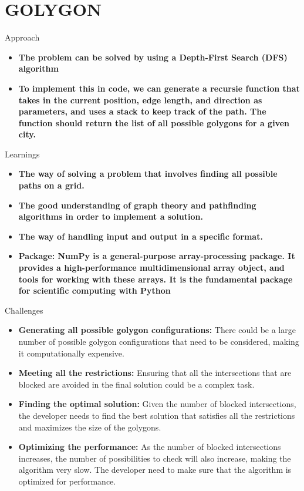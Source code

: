 \documentclass{beamer}
\begin{document}
\section{GOLYGON}
\begin{frame}{Approach}
\begin{itemize}
\item \textbf{The problem can be solved by using a Depth-First Search (DFS) algorithm}
\item \textbf{To implement this in code, we can generate a recursie function that takes  in the current position, edge length, and direction as parameters, and uses a stack to keep track of the path. The function should return the list of all possible golygons for a given city.}
\end{itemize}
\end{frame}
\begin{frame}{Learnings}
\begin{itemize}
\item\textbf{The way of solving a problem that involves finding all possible paths on a grid.}
\item\textbf{The good understanding of graph theory and pathfinding algorithms in order to implement a solution.}
\item\textbf{The way of handling input and output in a specific format.}
\item\textbf{Package: NumPy is a general-purpose array-processing package. It provides a high-performance multidimensional array object, and tools for working with these arrays. It is the fundamental package for scientific computing with Python}
\end{itemize}
\end{frame}
\begin{frame}{Challenges}
\begin{itemize}
\item\textbf{Generating all possible golygon configurations:} There could be a large number of possible golygon configurations that need to be considered, making it computationally expensive.
\item\textbf{Meeting all the restrictions:} Ensuring that all the intersections that are blocked are avoided in the final solution could be a complex task.
\item\textbf{Finding the optimal solution:} Given the number of blocked intersections, the developer needs to find the best solution that satisfies all the restrictions and maximizes the size of the golygons.
\item\textbf{Optimizing the performance:} As the number of blocked intersections increases, the number of possibilities to check will also increase, making the algorithm very slow. The developer need to make sure that the algorithm is optimized for performance.
\end{itemize}
\end{frame}
\end{document}
